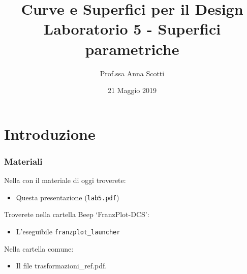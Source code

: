 \documentclass{beamer}
\title[Curve e Sup. - Lab 5]{Curve e Superfici per il Design \\ Laboratorio 5 - Superfici parametriche}
\author[Prof.ssa Scotti]{Prof.ssa Anna Scotti}
\date{21 Maggio 2019}
\begin{document}
\lstset{language=POV}
\begin{frame}
\maketitle
\end{frame}
\section{Introduzione}
\begin{frame}
\frametitle{Materiali}
Nella con il materiale di oggi troverete:
\begin{itemize}
\item Questa presentazione (\texttt{lab5.pdf})
\end{itemize}
Troverete nella cartella Beep `FranzPlot-DCS':
\begin{itemize}
\item L'eseguibile \texttt{franzplot\_launcher}
\end{itemize}
Nella cartella comune:
\begin{itemize}
\item Il file trasformazioni\_ref.pdf.
\end{itemize}
\end{frame}
%
\end{document}

